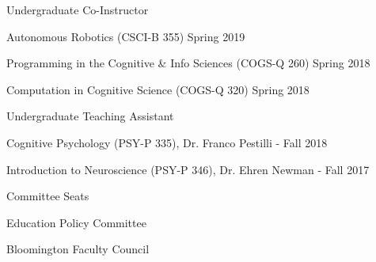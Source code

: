 \begin{cvpubentries}


  \cvpubentry
    {Undergraduate Co-Instructor} %
    { } %
    { } %
    { } %
    {
      \begin{cvitems} %
       \item{Autonomous Robotics (CSCI-B 355) Spring 2019}
        \item{Programming in the Cognitive \& Info Sciences (COGS-Q 260) Spring 2018}
	\item{Computation in Cognitive Science (COGS-Q 320) Spring 2018}
      \end{cvitems}
    }
  \cvpubentry
    {Undergraduate Teaching Assistant} %
    {} %
    {} %
    {} %
    {
      \begin{cvitems} %
        \item {Cognitive Psychology (PSY-P 335), Dr. Franco Pestilli - Fall 2018}
        \item {Introduction to Neuroscience (PSY-P 346), Dr. Ehren Newman - Fall 2017}
      \end{cvitems}
    }

\cvpubentry
    {Committee Seats} %
    {} %
    {} %
    {} %
    {
      \begin{cvitems} %
        \item {Education Policy Committee}
	\item{Bloomington Faculty Council}
      \end{cvitems}
    }

\end{cvpubentries}
